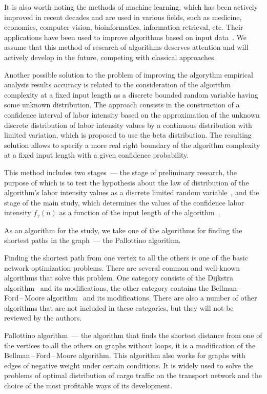 \documentclass[a4paper]{article}
\begin{document}
It is also worth noting the methods of machine learning, which has been actively improved in recent decades and are used in various fields, such as medicine, economics, computer vision, bioinformatics, information retrieval, etc. Their applications have been used to improve algorithms based on input data~\cite{berube}. We assume that this method of research of algorithms deserves attention and will actively develop in the future, competing with classical approaches.

Another possible solution to the problem of improving the algorythm empirical analysis results accuracy is related to the consideration of the algorithm complexity at a fixed input length as a discrete bounded random variable having some unknown distribution. The approach consists in the construction of a confidence interval of labor intensity based on the approximation of the unknown discrete distribution of labor intensity values by a continuous distribution with limited variation, which is proposed to use the beta distribution. The resulting solution allows to specify a more real right boundary of the algorithm complexity at a fixed input length with a given confidence probability.

This method includes two stages~--- the stage of preliminary research, the purpose of which is to test the hypothesis about the law of distribution of the algorithm's labor intensity values as a discrete limited random variable~\cite{petrushyn_ulyanov_planning}, and the stage of the main study, which determines the values of the confidence labor intensity $f_\gamma(n)$ as a function of the input length of the algorithm~\cite{petrushyn_ulyanov_analysis}.

As an algorithm for the study, we take one of the algorithms for finding the shortest paths in the graph~--- the Pallottino algorithm.

Finding the shortest path from one vertex to all the others is one of the basic network optimization problems. There are several common and well-known algorithms that solve this problem. One category consists of the Dijkstra algorithm~\cite{dijkstra} and its modifications, the other category contains the Bellman\,--\,Ford\,--\,Moore algorithm~\cite{bellman, ford, moore} and its modifications. There are also a number of other algorithms that are not included in these categories, but they will not be reviewed by the authors.

Pallottino algorithm~--- the algorithm that finds the shortest distance from one of the vertices to all the others on graphs without loops, it is a modification of the Bellman\,--\,Ford\,--\,Moore algorithm. This algorithm also works for graphs with edges of negative weight under certain conditions. It is widely used to solve the problems of optimal distribution of cargo traffic on the transport network and the choice of the most profitable ways of its development.
\end{document}
